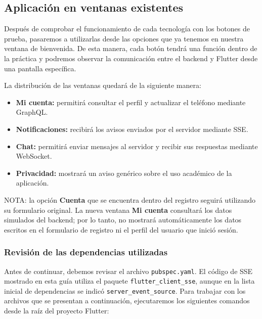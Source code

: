 \subsection{Aplicación en ventanas existentes}


Después de comprobar el funcionamiento de cada tecnología con los botones de prueba, pasaremos a utilizarlas desde las opciones que ya tenemos en nuestra ventana de bienvenida. De esta manera, cada botón tendrá una función dentro de la práctica y podremos observar la comunicación entre el backend y Flutter desde una pantalla específica.

La distribución de las ventanas quedará de la siguiente manera:
\begin{itemize}
    \item \textbf{Mi cuenta:} permitirá consultar el perfil y actualizar el teléfono mediante GraphQL.
    \item \textbf{Notificaciones:} recibirá los avisos enviados por el servidor mediante SSE.
    \item \textbf{Chat:} permitirá enviar mensajes al servidor y recibir sus respuestas mediante WebSocket.
    \item \textbf{Privacidad:} mostrará un aviso genérico sobre el uso académico de la aplicación.
\end{itemize}

NOTA: la opción \textbf{Cuenta} que se encuentra dentro del registro seguirá utilizando su formulario original. La nueva ventana \textbf{Mi cuenta} consultará los datos simulados del backend; por lo tanto, no mostrará automáticamente los datos escritos en el formulario de registro ni el perfil del usuario que inició sesión.

\subsubsection{Revisión de las dependencias utilizadas}
Antes de continuar, debemos revisar el archivo \texttt{pubspec.yaml}. El código de SSE mostrado en esta guía utiliza el paquete \texttt{flutter\_client\_sse}, aunque en la lista inicial de dependencias se indicó \texttt{server\_event\_source}. Para trabajar con los archivos que se presentan a continuación, ejecutaremos los siguientes comandos desde la raíz del proyecto Flutter:

